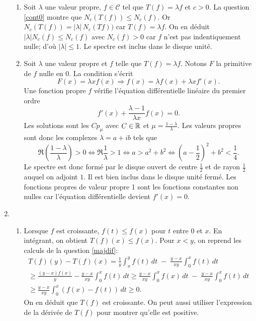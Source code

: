 \begin{enumerate}
\begin{enumerate}
 \item Soit $\lambda$ une valeur propre, $f\in \mathcal{C}$ tel que $T(f)=\lambda f$ et $c>0$.\newline
 La question \ref{cont0} montre que $N_c(T(f))\leq N_c(f)$. Or $N_c(T(f)) = |\lambda|\,N_c(Tf))$ car $T(f) = \lambda f$. On en déduit $|\lambda| N_c(f)\leq N_c(f)$ avec $N_c(f)>0$ car $f$ n'est pas indentiquement nulle; d'où $|\lambda|\leq1$. Le spectre est inclus dans le disque unité.
 
 \item Soit $\lambda$ une valeur propre et $f$ telle que $T(f)=\lambda f$. Notons $F$ la primitive de $f$ nulle en $0$. La condition s'écrit
\begin{displaymath}
 F(x) = \lambda x f(x)\Rightarrow f(x) = \lambda f(x) + \lambda x f'(x).
\end{displaymath}
Une fonction propre $f$ vérifie l'équation différentielle linéaire du premier ordre
\begin{displaymath}
 f'(x) +\frac{\lambda -1}{\lambda x}f(x) = 0.
\end{displaymath}
Les solutions sont les $Cp_\mu$ avec $C\in \mathbb{R}$ et $\mu = \frac{1-\lambda}{\lambda}$. Les valeurs propres sont donc les complexes $\lambda = a + ib$ tels que 
\begin{displaymath}
 \Re\left( \frac{1-\lambda}{\lambda}\right)>0
\Leftrightarrow \Re \frac{1}{\lambda} > 1
\Leftrightarrow  a> a^2 + b^2
\Leftrightarrow (a-\frac{1}{2})^2 + b^2< \frac{1}{4}.
\end{displaymath}
Le spectre est donc formé par le disque ouvert de centre $\frac{1}{2}$ et de rayon $\frac{1}{2}$ auquel on adjoint $1$. Il est bien inclus dans le disque unité fermé.\newline
Les fonctions propres de valeur propre 1 sont les fonctions constantes non nulles car l'équation différentielle devient $f'(x) = 0$. 
\end{enumerate}

 \item
\begin{enumerate}
 \item Lorsque $f$ est croissante, $f(t)\leq f(x)$ pour $t$ entre $0$ et $x$. En intégrant, on obtient $T(f)(x)\leq f(x)$. Pour $x < y$, on reprend les calculs de la question \ref{majdif}:
\begin{multline*}
 T(f)(y)-T(f)(x)
=\frac{1}{y}\int_x^yf(t)\,dt \;-\; \frac{y-x}{xy}\int_0^xf(t)\,dt\\
\geq \frac{(y-x)f(x)}{y} - \frac{y-x}{xy}\int_0^xf(t)\,dt 
\geq \frac{y-x}{xy}\int_0^xf(x)\, dt \;-\; \frac{y-x}{xy}\int_0^xf(t)\,dt \\
\geq \frac{y-x}{xy}\int_0^x(f(x)-f(t))\, dt \geq 0.
\end{multline*}
On en déduit que $T(f)$ est croissante. On peut aussi utiliser l'expression de la dérivée de $T(f)$ pour montrer qu'elle est positive.


\end{enumerate}
\end{enumerate}
